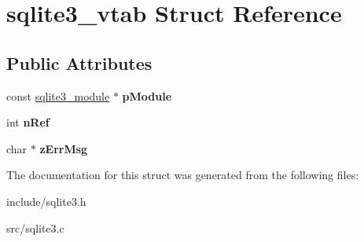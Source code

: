 \hypertarget{structsqlite3__vtab}{\section{sqlite3\-\_\-vtab Struct Reference}
\label{structsqlite3__vtab}
}
\subsection*{Public Attributes}
\begin{DoxyCompactItemize}
\item 
\hypertarget{structsqlite3__vtab_acf0d906e36b113669eaa883c5f8b5ba0}{const \hyperlink{structsqlite3__module}{sqlite3\-\_\-module} $\ast$ {\bfseries p\-Module}}\label{structsqlite3__vtab_acf0d906e36b113669eaa883c5f8b5ba0}

\item 
\hypertarget{structsqlite3__vtab_ab3c80d385849bdd82363a0df7d6fcba8}{int {\bfseries n\-Ref}}\label{structsqlite3__vtab_ab3c80d385849bdd82363a0df7d6fcba8}

\item 
\hypertarget{structsqlite3__vtab_a47331586775d674ae951b07ebb902fca}{char $\ast$ {\bfseries z\-Err\-Msg}}\label{structsqlite3__vtab_a47331586775d674ae951b07ebb902fca}

\end{DoxyCompactItemize}


The documentation for this struct was generated from the following files\-:\begin{DoxyCompactItemize}
\item 
include/sqlite3.\-h\item 
src/sqlite3.\-c\end{DoxyCompactItemize}
